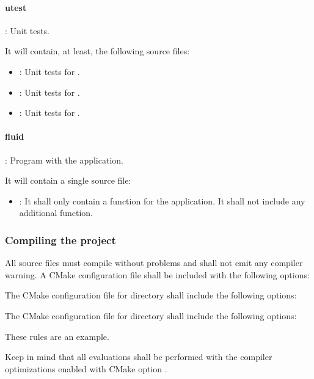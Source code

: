 \paragraph{utest}: Unit tests.

It will contain, at least, the following source files:
\begin{itemize}
  \item {}: 
        Unit tests for .
  \item {}:
        Unit tests for .
  \item {}:
        Unit tests for .
\end{itemize}

\paragraph{fluid}: Program with the application.

It will contain a single source file:
\begin{itemize}
  \item {}: 
        It shall only contain a  function for the application.
        It shall not include any additional function.
\end{itemize}

\subsubsection{Compiling the project}

All source files must compile without problems and shall not emit any compiler warning.
A CMake configuration file shall be included with the following options:



The CMake configuration file for directory  shall include the
following options:



The CMake configuration file for directory  shall include the
following options:



These rules are an example. 

Keep in mind that all evaluations shall be performed with the compiler optimizations
enabled with CMake option
.

